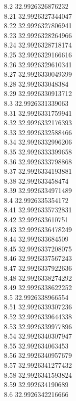 {8.2	32.9926326876232\\
8.21	32.9926327344047\\
8.22	32.9926327806941\\
8.23	32.9926328264966\\
8.24	32.9926328718174\\
8.25	32.9926329166616\\
8.26	32.9926329610341\\
8.27	32.9926330049399\\
8.28	32.992633048384\\
8.29	32.9926330913712\\
8.3	32.9926331339063\\
8.31	32.9926331759941\\
8.32	32.9926332176393\\
8.33	32.9926332588466\\
8.34	32.9926332996206\\
8.35	32.9926333399658\\
8.36	32.9926333798868\\
8.37	32.9926334193881\\
8.38	32.992633458474\\
8.39	32.9926334971489\\
8.4	32.9926335354172\\
8.41	32.9926335732831\\
8.42	32.992633610751\\
8.43	32.9926336478249\\
8.44	32.992633684509\\
8.45	32.9926337208075\\
8.46	32.9926337567243\\
8.47	32.9926337922636\\
8.48	32.9926338274292\\
8.49	32.9926338622252\\
8.5	32.9926338966554\\
8.51	32.9926339307236\\
8.52	32.9926339644338\\
8.53	32.9926339977896\\
8.54	32.9926340307947\\
8.55	32.992634063453\\
8.56	32.9926340957679\\
8.57	32.9926341277432\\
8.58	32.9926341593824\\
8.59	32.992634190689\\
8.6	32.9926342216666\\
}
